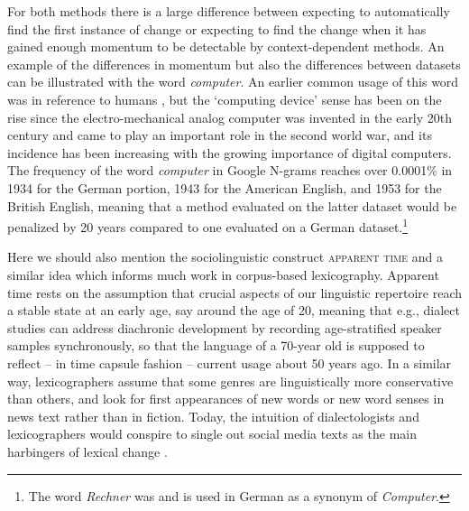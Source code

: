 \documentclass[output=paper]{langsci/langscibook}
\begin{document}
For both methods there is a large difference between expecting to automatically find the first instance of change or expecting to find the change when it has gained enough momentum to be detectable by context-dependent methods.  An example of the differences in momentum but also the differences between datasets can be illustrated with the word \emph{computer}. An earlier common usage of this word was in reference to humans \citep{grier-2005}, but the `computing device' sense has been on the rise since the electro-mechanical analog computer was invented in the early 20th century and came to play an important role in the second world war, and its incidence has been increasing with the growing importance of digital computers. 
    The frequency of the word \emph{computer} in Google N-grams reaches over 0.0001\% in 1934 for the German portion, 1943 for the American English, and 1953 for the British English, meaning that a method evaluated on the latter dataset would be penalized by 20 years compared to one evaluated on a German dataset.\footnote{The word \emph{Rechner} was and is used in German as a synonym of \emph{Computer}.}    

Here we should also mention the sociolinguistic construct \textsc{apparent time} \citep{mague-2006} and a similar idea which informs much work in corpus-based lexicography. Apparent time rests on the assumption that crucial aspects of our linguistic repertoire reach a stable state at an early age, say around the age of 20, meaning that e.g., dialect studies can address diachronic development by recording age-stratified speaker samples synchronously, so that the language of a 70-year old is supposed to reflect -- in time capsule fashion -- current usage about 50 years ago. In a similar way, lexicographers assume that some genres are linguistically more conservative than others, and look for first appearances of new words or new word senses in news text rather than in fiction. Today, the intuition of dialectologists and lexicographers would conspire to single out social media texts as the main harbingers of lexical change \citep[e.g.,][]{fiser-ljubesic-2018}.
    
\end{document}
